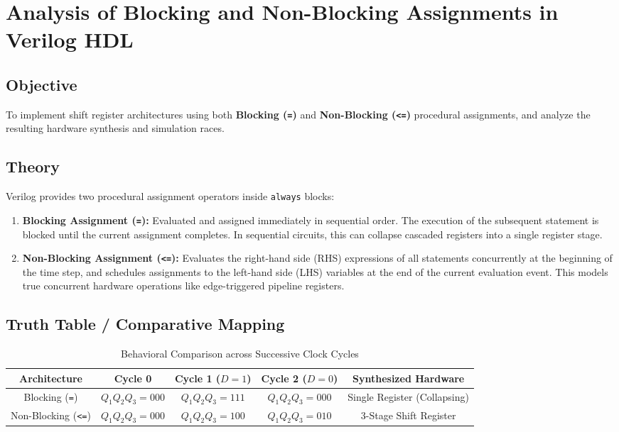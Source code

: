 \documentclass[12pt,a4paper]{report}
\begin{document}


\chapter{Analysis of Blocking and Non-Blocking Assignments in Verilog HDL}
\label{ch:exp8}

\section{Objective}

To implement shift register architectures using both \textbf{Blocking (\texttt{=})} and \textbf{Non-Blocking (\texttt{<=})} procedural assignments, and analyze the resulting hardware synthesis and simulation races.

\section{Theory}

Verilog provides two procedural assignment operators inside \texttt{always} blocks:
\begin{enumerate}
    \item \textbf{Blocking Assignment (\texttt{=}):} Evaluated and assigned immediately in sequential order. The execution of the subsequent statement is blocked until the current assignment completes. In sequential circuits, this can collapse cascaded registers into a single register stage.
    \item \textbf{Non-Blocking Assignment (\texttt{<=}):} Evaluates the right-hand side (RHS) expressions of all statements concurrently at the beginning of the time step, and schedules assignments to the left-hand side (LHS) variables at the end of the current evaluation event. This models true concurrent hardware operations like edge-triggered pipeline registers.
\end{enumerate}

\section{Truth Table / Comparative Mapping}

\begin{table}[H]
    \centering
    \caption{Behavioral Comparison across Successive Clock Cycles}
    \begin{tabular}{|c|c|c|c|c|}
        \hline
        \textbf{Architecture} & \textbf{Cycle 0} & \textbf{Cycle 1 ($D=1$)} & \textbf{Cycle 2 ($D=0$)} & \textbf{Synthesized Hardware} \\
        \hline
        Blocking (\texttt{=}) & $Q_1 Q_2 Q_3 = 000$ & $Q_1 Q_2 Q_3 = 111$ & $Q_1 Q_2 Q_3 = 000$ & Single Register (Collapsing) \\
        \hline
        Non-Blocking (\texttt{<=}) & $Q_1 Q_2 Q_3 = 000$ & $Q_1 Q_2 Q_3 = 100$ & $Q_1 Q_2 Q_3 = 010$ & 3-Stage Shift Register \\
        \hline
    \end{tabular}
\end{table}
\end{document}

